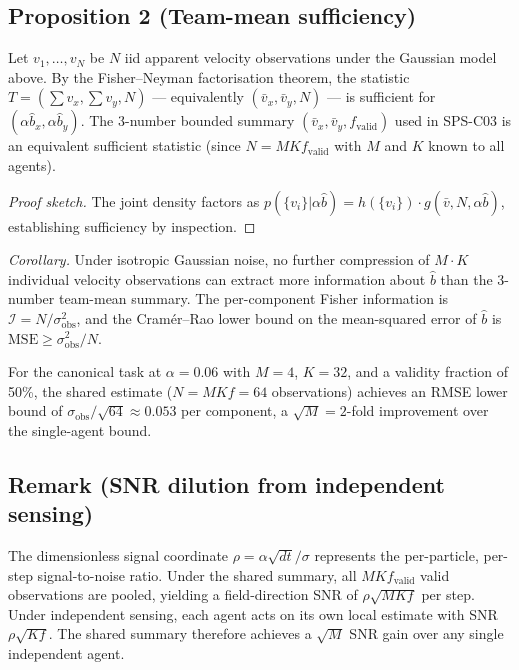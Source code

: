 \documentclass{article}
\begin{document}
\subsection*{Proposition 2 (Team-mean sufficiency)}

Let $v_1,\ldots,v_N$ be $N$ iid apparent velocity observations under the Gaussian
model above.  By the Fisher--Neyman factorisation theorem, the statistic
$T = (\sum v_x, \sum v_y, N)$ — equivalently $(\bar{v}_x, \bar{v}_y, N)$ — is
sufficient for $(\alpha\hat{b}_x, \alpha\hat{b}_y)$.  The 3-number bounded
summary $(\bar{v}_x,\bar{v}_y, f_{\mathrm{valid}})$ used in SPS-C03 is an
equivalent sufficient statistic (since $N = M K f_{\mathrm{valid}}$ with $M$
and $K$ known to all agents).

\begin{proof}[Proof sketch]
The joint density factors as
$p(\{v_i\}|\alpha\hat{b}) = h(\{v_i\})\cdot g(\bar{v}, N, \alpha\hat{b})$,
establishing sufficiency by inspection.
\end{proof}

\textit{Corollary.}  Under isotropic Gaussian noise, no further compression of
$M\!\cdot\! K$ individual velocity observations can extract more information about
$\hat{b}$ than the 3-number team-mean summary.  The per-component Fisher
information is $\mathcal{I} = N/\sigma_{\mathrm{obs}}^2$, and the Cram\'er--Rao
lower bound on the mean-squared error of $\hat{b}$ is
$\mathrm{MSE} \geq \sigma_{\mathrm{obs}}^2/N$.

For the canonical task at $\alpha=0.06$ with $M=4$, $K=32$, and a validity
fraction of 50\%, the shared estimate ($N=M K f=64$ observations) achieves an
RMSE lower bound of $\sigma_{\mathrm{obs}}/\sqrt{64} \approx 0.053$ per component,
a $\sqrt{M}=2$-fold improvement over the single-agent bound.

\subsection*{Remark (SNR dilution from independent sensing)}

The dimensionless signal coordinate $\rho = \alpha\sqrt{dt}/\sigma$ represents
the per-particle, per-step signal-to-noise ratio.  Under the shared summary, all
$M K f_{\mathrm{valid}}$ valid observations are pooled, yielding a
field-direction SNR of $\rho\sqrt{MKf}$ per step.  Under independent sensing,
each agent acts on its own local estimate with SNR $\rho\sqrt{Kf}$.  The shared
summary therefore achieves a $\sqrt{M}$ SNR gain over any single independent agent.
\end{document}
